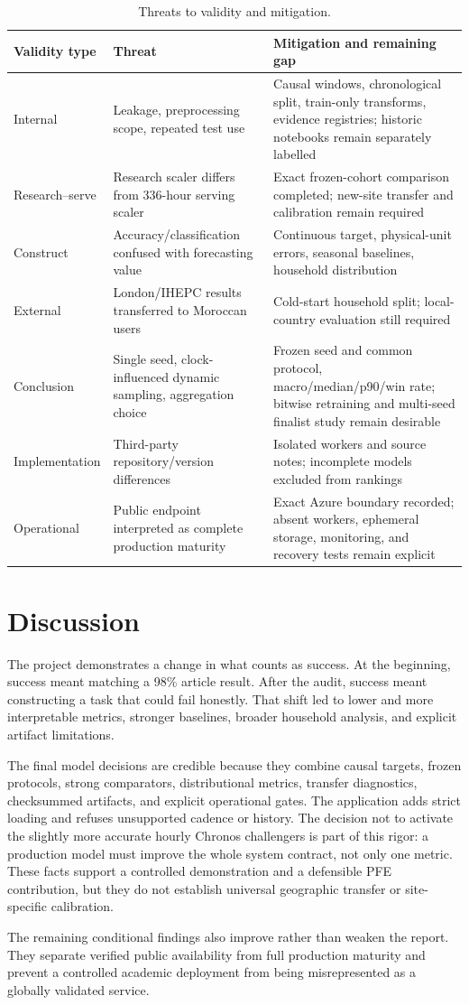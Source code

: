 \begin{table}[H]
\centering
\caption{Threats to validity and mitigation.}
\label{tab:validity}
\begin{tabularx}{\textwidth}{p{}YY}
\toprule
Validity type & Threat & Mitigation and remaining gap \\
\midrule
Internal & Leakage, preprocessing scope, repeated test use & Causal windows, chronological split, train-only transforms, evidence registries; historic notebooks remain separately labelled \\
Research--serve & Research scaler differs from 336-hour serving scaler & Exact frozen-cohort comparison completed; new-site transfer and calibration remain required \\
Construct & Accuracy/classification confused with forecasting value & Continuous target, physical-unit errors, seasonal baselines, household distribution \\
External & London/IHEPC results transferred to Moroccan users & Cold-start household split; local-country evaluation still required \\
Conclusion & Single seed, clock-influenced dynamic sampling, aggregation choice & Frozen seed and common protocol, macro/median/p90/win rate; bitwise retraining and multi-seed finalist study remain desirable \\
Implementation & Third-party repository/version differences & Isolated workers and source notes; incomplete models excluded from rankings \\
Operational & Public endpoint interpreted as complete production maturity & Exact Azure boundary recorded; absent workers, ephemeral storage, monitoring, and recovery tests remain explicit \\
\bottomrule
\end{tabularx}
\end{table}

\section{Discussion}

The project demonstrates a change in what counts as success. At the beginning, success meant matching a 98\% article result. After the audit, success meant constructing a task that could fail honestly. That shift led to lower and more interpretable metrics, stronger baselines, broader household analysis, and explicit artifact limitations.

The final model decisions are credible because they combine causal targets, frozen protocols, strong comparators, distributional metrics, transfer diagnostics, checksummed artifacts, and explicit operational gates. The application adds strict loading and refuses unsupported cadence or history. The decision not to activate the slightly more accurate hourly Chronos challengers is part of this rigor: a production model must improve the whole system contract, not only one metric. These facts support a controlled demonstration and a defensible PFE contribution, but they do not establish universal geographic transfer or site-specific calibration.

The remaining conditional findings also improve rather than weaken the report. They separate verified public availability from full production maturity and prevent a controlled academic deployment from being misrepresented as a globally validated service.
